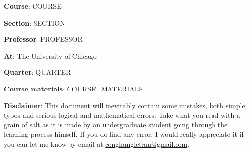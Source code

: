 \textbf{Course}: COURSE

\textbf{Section}: SECTION

\textbf{Professor}: PROFESSOR

\textbf{At}: The University of Chicago

\textbf{Quarter}: QUARTER

\textbf{Course materials}: COURSE_MATERIALS

\vspace{1cm}
\textbf{Disclaimer}: This document will inevitably contain some mistakes, both simple typos and serious logical and mathematical errors. Take what you read with a grain of salt as it is made by an undergraduate student going through the learning process himself. If you do find any error, I would really appreciate it if you can let me know by email at \href{mailto:conghungletran@gmail.com}{conghungletran@gmail.com}.